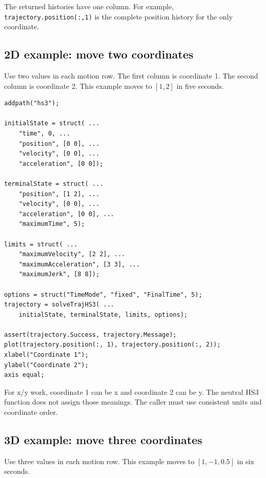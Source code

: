 \documentclass[10pt,letterpaper]{article}
\newcommand{\file}[1]{\nolinkurl{#1}}
\begin{document}
The returned histories have one column. For example,
\file{trajectory.position(:,1)} is the complete position history for the only
coordinate.

\subsection{2D example: move two coordinates}

Use two values in each motion row. The first column is coordinate 1. The second
column is coordinate 2. This example moves to $[1,2]$ in five seconds.

\begin{lstlisting}
addpath("hs3");

initialState = struct( ...
    "time", 0, ...
    "position", [0 0], ...
    "velocity", [0 0], ...
    "acceleration", [0 0]);

terminalState = struct( ...
    "position", [1 2], ...
    "velocity", [0 0], ...
    "acceleration", [0 0], ...
    "maximumTime", 5);

limits = struct( ...
    "maximumVelocity", [2 2], ...
    "maximumAcceleration", [3 3], ...
    "maximumJerk", [8 8]);

options = struct("TimeMode", "fixed", "FinalTime", 5);
trajectory = solveTrajHS3( ...
    initialState, terminalState, limits, options);

assert(trajectory.Success, trajectory.Message);
plot(trajectory.position(:, 1), trajectory.position(:, 2));
xlabel("Coordinate 1");
ylabel("Coordinate 2");
axis equal;
\end{lstlisting}

For x/y work, coordinate 1 can be x and coordinate 2 can be
y. The neutral HS3 function does not assign those meanings. The caller
must use consistent units and coordinate order.

\subsection{3D example: move three coordinates}

Use three values in each motion row. This example moves to
$[1,-1,0.5]$ in six seconds.
\end{document}
